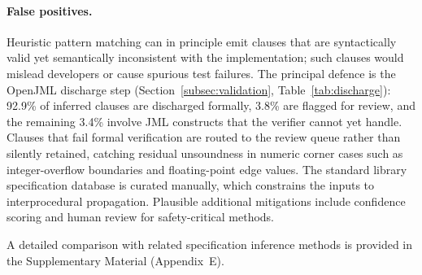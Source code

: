 \paragraph{False positives.} Heuristic pattern matching can in principle emit clauses that are syntactically valid yet semantically inconsistent with the implementation; such clauses would mislead developers or cause spurious test failures. The principal defence is the OpenJML discharge step (Section~\ref{subsec:validation}, Table~\ref{tab:discharge}): 92.9\% of inferred clauses are discharged formally, 3.8\% are flagged for review, and the remaining 3.4\% involve JML constructs that the verifier cannot yet handle. Clauses that fail formal verification are routed to the review queue rather than silently retained, catching residual unsoundness in numeric corner cases such as integer-overflow boundaries and floating-point edge values. The standard library specification database is curated manually, which constrains the inputs to interprocedural propagation. Plausible additional mitigations include confidence scoring and human review for safety-critical methods.

A detailed comparison with related specification inference methods is provided in the Supplementary Material (Appendix~E).

